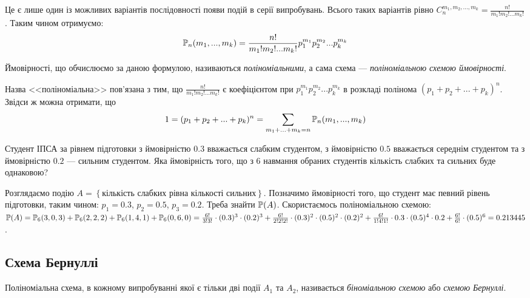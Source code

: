 Це є лише один із можливих варіантів послідовності появи подій в серії випробувань. Всього таких варіантів 
рівно $C_n^{m_1, m_2, ..., m_k} = \frac{n!}{m_1!m_2! ... m_k!}$. Таким чином отримуємо:
\begin{equation}\label{eq:poly_prob}
    \P_n(m_1, ..., m_k) = \frac{n!}{m_1!m_2! ... m_k!} p_1^{m_1} p_2^{m_2} ... p_k^{m_k}
\end{equation}
\begin{definition}
    Ймовірності, що обчислюємо за даною формулою, називаються \emph{поліноміальними}, а 
    сама схема --- \emph{поліноміальною схемою ймовірності}. 
\end{definition}
\begin{remark} Назва <<поліноміальна>> пов'язана з тим, що $\frac{n!}{m_1!m_2! ... m_k!}$
    є коефіцієнтом при $p_1^{m_1} p_2^{m_2} ... p_k^{m_k}$ в розкладі полінома $(p_1 + p_2 + ... + p_k)^n$.
    Звідси ж можна отримати, що
    $$1 = (p_1 + p_2 + ... + p_k)^n = \sum\limits_{m_1 + ... + m_k = n} \P_n(m_1, ..., m_k)$$
\end{remark}
\begin{example}
    Студент ІПСА за рівнем підготовки з ймовірністю $0.3$ вважається слабким студентом, 
    з ймовірністю $0.5$ вважається середнім студентом та 
    з ймовірністю $0.2$ --- сильним студентом. Яка ймовірність того, що з 6 навмання 
    обраних студентів кількість слабких та сильних буде однаковою?

    Розглядаємо подію $A = \left\{\text{кількість слабких рівна кількості сильних}\right\}$. 
    Позначимо ймовірності того, що студент має певний рівень підготовки, таким чином:
    $p_1 = 0.3$, $p_2 = 0.5$, $p_3 = 0.2$.
    Треба знайти $\P(A)$.
    Скористаємось поліноміальною схемою:
    $\P(A) = \P_6(3, 0, 3) + \P_6(2, 2, 2) + \P_6(1, 4, 1) + \P_6(0, 6, 0) = 
    \frac{6!}{3!3!}\cdot(0.3)^3 \cdot(0.2)^3 + \frac{6!}{2!2!2!}\cdot(0.3)^2 \cdot(0.5)^2 \cdot(0.2)^2 + 
    \frac{6!}{1!4!1!}\cdot0.3 \cdot(0.5)^4 \cdot 0.2 + \frac{6!}{6!} \cdot(0.5)^6 = 0.213445$.
\end{example}
\subsection{Схема Бернуллі}
\begin{definition}
    Поліноміальна схема, в кожному випробуванні якої є тільки дві події $A_1$ та $A_2$, 
    називається \emph{біноміальною схемою} або \emph{схемою Бернуллі}.
\end{definition}

